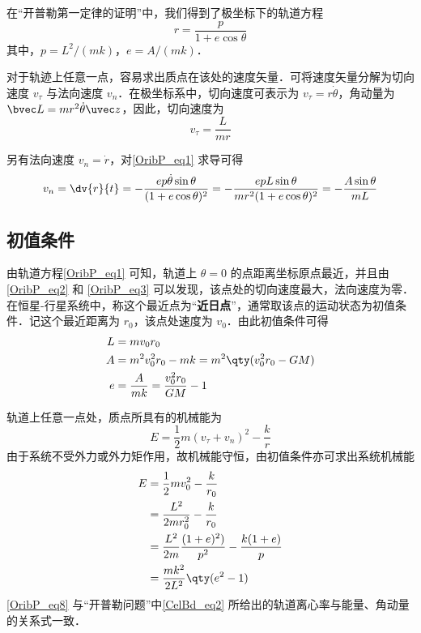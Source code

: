 

在“开普勒第一定律的证明”中，我们得到了极坐标下的轨道方程
\begin{equation}\label{OribP_eq1} 
r=\frac{p}{1+e \cos\theta}
\end{equation}
其中，$p=L^2/(mk)$，$e=A/(mk)$．

对于轨迹上任意一点，容易求出质点在该处的速度矢量．可将速度矢量分解为切向速度 $v_\tau$ 与法向速度 $v_n$．在极坐标系中，切向速度可表示为 $v_\tau =r \dot\theta$，角动量为 $\bvec L  = mr^2\dot{\theta}\uvec z$，因此，切向速度为
\begin{equation}\label{OribP_eq2} 
v_\tau =\frac{L}{mr}
\end{equation}

另有法向速度 $v_n=\dot r$，对\autoref{OribP_eq1} 求导可得
\begin{equation} \label{OribP_eq3}
v_n =\dv{r}{t}=-\frac{ep\dot{\theta}\sin\theta}{(1+e\cos\theta)^2}=-\frac{epL\sin\theta}{mr^2(1+e\cos\theta)^2}=-\frac{A\sin\theta}{mL}
\end{equation}

\subsection{初值条件}
由轨道方程\autoref{OribP_eq1} 可知，轨道上 $\theta=0$ 的点距离坐标原点最近，并且由\autoref{OribP_eq2} 和 \autoref{OribP_eq3} 可以发现，该点处的切向速度最大，法向速度为零．在恒星-行星系统中，称这个最近点为“\textbf{近日点}”，通常取该点的运动状态为初值条件．记这个最近距离为 $r_0$，该点处速度为 $v_0$．由此初值条件可得
\begin{align}
L &= mv_0r_0\\
A &= m^2v_0^2r_0-mk=m^2\qty(v_0^2r_0-GM)\\
e &= \frac{A}{mk}=\frac{v_0^2r_0}{GM}-1 
\end{align}

轨道上任意一点处，质点所具有的机械能为
\begin{equation} 
E =\frac{1}{2}m(v_{\tau}+v_n)^2-\frac{k}{r}
\end{equation}
由于系统不受外力或外力矩作用，故机械能守恒，由初值条件亦可求出系统机械能
\begin{equation} \label{OribP_eq8}
\begin{aligned}
E &=\frac{1}{2}mv_0^2-\frac{k}{r_0}\\
   &=\frac{L^2}{2mr_0^2}-\frac{k}{r_0}\\
   &=\frac{L^2}{2m}\frac{(1+e)^2)}{p^2}-\frac{k(1+e)}{p}\\
   &=\frac{mk^2}{2L^2}\qty(e^2-1)
\end{aligned}
\end{equation}
\autoref{OribP_eq8} 与“开普勒问题”中\autoref{CelBd_eq2} 所给出的轨道离心率与能量、角动量的关系式一致．


